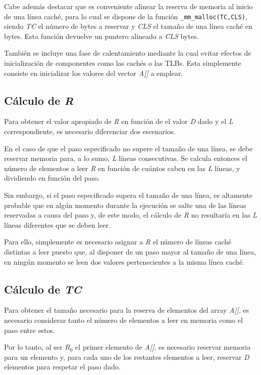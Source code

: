 \documentclass[conference]{IEEEtran}
\begin{document}
Cabe además destacar que es conveniente alinear la reserva de memoria al inicio de una línea caché, para lo cual se dispone de la función \texttt{\_mm\_malloc(TC,CLS)}, siendo \textit{TC} el número de bytes a reservar y \textit{CLS} el tamaño de una línea caché en bytes. Esta función devuelve un puntero alineado a \textit{CLS} bytes.

También se incluye una fase de calentamiento mediante la cual evitar efectos de inicialización de componentes como las cachés o las TLBs. Esta simplemente consiste en inicializar los valores del vector \textit{A[]} a emplear.

\subsection{Cálculo de \textit{R}}
Para obtener el valor apropiado de \textit{R} en función de el valor \textit{D} dado y el \textit{L} correspondiente, es necesario diferenciar dos escenarios.

En el caso de que el paso especificado no supere el tamaño de una línea, se debe reservar memoria para, a lo sumo, \textit{L} líneas consecutivas. Se calcula entonces el número de elementos a leer \textit{R} en función de cuántos caben en las \textit{L} líneas, y dividiendo en función del paso.

Sin embargo, si el paso especificado supera el tamaño de una línea, es altamente probable que en algún momento durante la ejecución se salte una de las líneas reservadas a causa del paso y, de este modo, el cálculo de \textit{R} no resultaría en las \textit{L} líneas diferentes que se deben leer.

Para ello, simplemente es necesario asignar a \textit{R} el número de líneas caché distintas a leer puesto que, al disponer de un paso mayor al tamaño de una línea, en ningún momento se leen dos valores pertenecientes a la misma línea caché.

\subsection{Cálculo de \textit{TC}}
Para obtener el tamaño necesario para la reserva de elementos del array \textit{A[]}, es necesario considerar tanto el número de elementos a leer en memoria como el paso entre estos.

Por lo tanto, al ser $R_{0}$ el primer elemento de \textit{A[]}, es necesario reservar memoria para un elemento y, para cada uno de los restantes elementos a leer, reservar \textit{D} elementos para respetar el paso dado.
\end{document}
